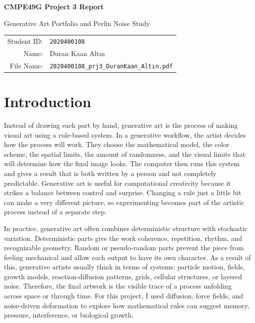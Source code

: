 \documentclass[11pt,a4paper]{article}
\begin{document}
\begin{center}
    {\LARGE\bfseries\color{ink} CMPE49G Project 3 Report\par}
    \vspace{0.4em}
    {\large Generative Art Portfolio and Perlin Noise Study\par}
    \vspace{1em}
    \begin{tabular}{rl}
        Student ID: & \texttt{2020400108} \\
        Name: & Duran Kaan Altın \\
        File Name: & \texttt{2020400108\_prj3\_DuranKaan\_Altın.pdf}
    \end{tabular}
\end{center}

\vspace{1.3em}

\section{Introduction}
Instead of drawing each part by hand, generative art is the process of making visual art using a rule-based system. In a generative workflow, the artist decides how the process will work. They choose the mathematical model, the color scheme, the spatial limits, the amount of randomness, and the visual limits that will determine how the final image looks. The computer then runs this system and gives a result that is both written by a person and not completely predictable. Generative art is useful for computational creativity because it strikes a balance between control and surprise. Changing a rule just a little bit can make a very different picture, so experimenting becomes part of the artistic process instead of a separate step.

In practice, generative art often combines deterministic structure with stochastic variation. Deterministic parts give the work coherence, repetition, rhythm, and recognizable geometry. Random or pseudo-random parts prevent the piece from feeling mechanical and allow each output to have its own character. As a result of this, generative artists usually think in terms of systems: particle motion, fields, growth models, reaction-diffusion patterns, grids, cellular structures, or layered noise. Therefore, the final artwork is the visible trace of a process unfolding across space or through time. For this project, I used diffusion, force fields, and noise-driven deformation to explore how mathematical rules can suggest memory, pressure, interference, or biological growth.
\end{document}
